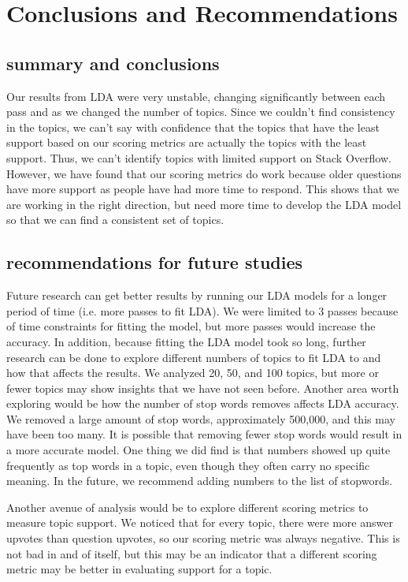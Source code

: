 \section{Conclusions and Recommendations}


\subsection{summary and conclusions}
Our results from LDA were very unstable, changing significantly between each pass and as we changed the number of topics. Since we couldn’t find consistency in the topics, we can’t say with confidence that the topics that have the least support based on our scoring metrics are actually the topics with the least support. Thus, we can’t identify topics with limited support on Stack Overflow. However, we have found that our scoring metrics do work because older questions have more support as people have had more time to respond. This shows that we are working in the right direction, but need more time to develop the LDA model so that we can find a consistent set of topics.
\subsection{recommendations for future studies}
Future research can get better results by running our LDA models for a longer period of time (i.e. more passes to fit LDA). We were limited to 3 passes because of time constraints for fitting the model, but more passes would increase the accuracy. In addition, because fitting the LDA model took so long, further research can be done to explore different numbers of topics to fit LDA to and how that affects the results. We analyzed 20, 50, and 100 topics, but more or fewer topics may show insights that we have not seen before. Another area worth exploring would be how the number of stop words removes affects LDA accuracy. We removed a large amount of stop words, approximately 500,000, and this may have been too many. It is possible that removing fewer stop words would result in a more accurate model. One thing we did find is that numbers showed up quite frequently as top words in a topic, even though they often carry no specific meaning. In the future, we recommend adding numbers to the list of stopwords.

Another avenue of analysis would be to explore different scoring metrics to measure topic support. We noticed that for every topic, there were more answer upvotes than question upvotes, so our scoring metric was always negative. This is not bad in and of itself, but this may be an indicator that a different scoring metric may be better in evaluating support for a topic.

